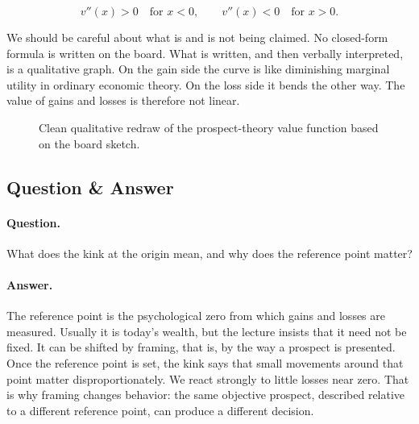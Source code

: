 \begin{equation}
v''(x)>0 \quad \text{for } x<0, \qquad
v''(x)<0 \quad \text{for } x>0.
\end{equation}

We should be careful about what is and is not being claimed. No closed-form formula is written on the board. What is written, and then verbally interpreted, is a qualitative graph. On the gain side the curve is like diminishing marginal utility in ordinary economic theory. On the loss side it bends the other way. The value of gains and losses is therefore not linear.

\begin{figure}[h]
\centering
{}
\caption{Clean qualitative redraw of the prospect-theory value function based on the board sketch.}
\end{figure}

\subsection{Question \& Answer}

\paragraph{Question.} What does the kink at the origin mean, and why does the reference point matter?

\paragraph{Answer.} The reference point is the psychological zero from which gains and losses are measured. Usually it is today's wealth, but the lecture insists that it need not be fixed. It can be shifted by framing, that is, by the way a prospect is presented. Once the reference point is set, the kink says that small movements around that point matter disproportionately. We react strongly to little losses near zero. That is why framing changes behavior: the same objective prospect, described relative to a different reference point, can produce a different decision.

